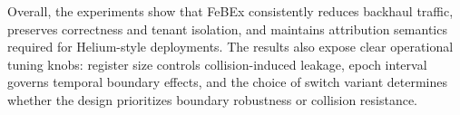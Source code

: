 Overall, the experiments show that FeBEx consistently reduces backhaul traffic, preserves correctness and tenant isolation, and maintains attribution semantics required for Helium-style deployments. The results also expose clear operational tuning knobs: register size controls collision-induced leakage, epoch interval governs temporal boundary effects, and the choice of switch variant determines whether the design prioritizes boundary robustness or collision resistance.